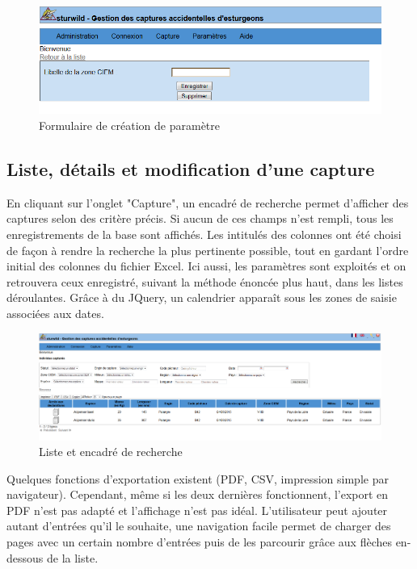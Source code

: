 \documentclass[12pt,a4paper,titlepage,twoside]{report}
\begin{document}
\begin{figure}[h]
\centering
\includegraphics[width=\textwidth]{pictures/paramNouveau.png}
\caption{Formulaire de création de paramètre}
\end{figure}
\clearpage

\subsection{Liste, détails et modification d'une capture}
En cliquant sur l'onglet "Capture", un encadré de recherche permet d'afficher des captures selon des critère précis. Si aucun de ces champs n'est rempli, tous les enregistrements de la base sont affichés. Les intitulés des colonnes ont été choisi de façon à rendre la recherche la plus pertinente possible, tout en gardant l'ordre initial des colonnes du fichier Excel.
Ici aussi, les paramètres sont exploités et on retrouvera ceux enregistré, suivant la méthode énoncée plus haut, dans les listes déroulantes. Grâce à du JQuery, un calendrier apparaît sous les zones de saisie associées aux dates. 

\begin{figure}[h]
\centering
\includegraphics[width=\textwidth]{pictures/listeCapture.png}
\caption{Liste et encadré de recherche}
\end{figure}

Quelques fonctions d'exportation existent (PDF, CSV, impression simple par navigateur). Cependant, même si les deux dernières fonctionnent, l'export en PDF n'est pas adapté et l'affichage n'est pas idéal.
L'utilisateur peut ajouter autant d'entrées qu'il le souhaite, une navigation facile permet de charger des pages avec un certain nombre d'entrées puis de les parcourir grâce aux flèches en-dessous de la liste.
\end{document}

